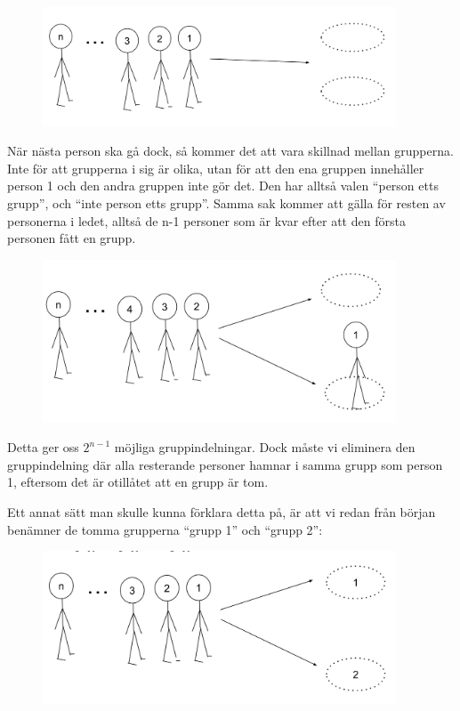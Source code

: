 \documentclass[nobib]{tufte-handout}
\begin{document}
\begin{xca2}
\begin{figure}[h]
\includegraphics[width=105mm]{ovning_2b.1.png}
\end{figure}

När nästa person ska gå dock, så kommer det att vara skillnad mellan grupperna. Inte för att grupperna i sig är olika, utan för att den ena gruppen innehåller person 1 och den andra gruppen inte gör det. Den har alltså valen “person etts grupp”, och “inte person etts grupp”. Samma sak kommer att gälla för resten av personerna i ledet, alltså de n-1 personer som är kvar efter att den första personen fått en grupp.


\begin{figure}[h]
\includegraphics[width=105mm]{ovning_2b.2.png}
\end{figure}

Detta ger oss $2^{n-1}$ möjliga gruppindelningar. Dock måste vi eliminera den gruppindelning där alla resterande personer hamnar i samma grupp som person 1, eftersom det är otillåtet att en grupp är tom.\\ \bigskip

Ett annat sätt man skulle kunna förklara detta på, är att vi redan från början benämner de tomma grupperna “grupp 1” och “grupp 2”:

\begin{figure}[h]
\includegraphics[width=105mm]{ovning_2b.3.png}
\end{figure}


\end{xca2}
\end{document}

